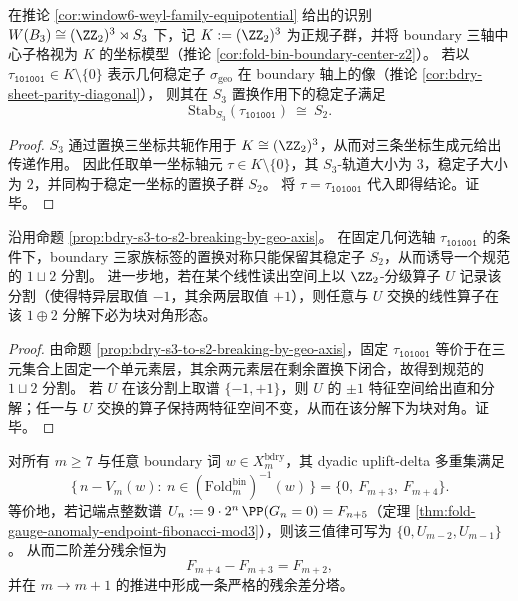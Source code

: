 \begin{proposition}\label{prop:bdry-s3-to-s2-breaking-by-geo-axis}
在推论 \ref{cor:window6-weyl-family-equipotential} 给出的识别
\(
W(B_3)\cong (\ZZ_2)^3\rtimes S_3
\)
下，记 \(K:=(\ZZ_2)^3\) 为正规子群，并将 boundary 三轴中心子格视为 \(K\) 的坐标模型（推论 \ref{cor:fold-bin-boundary-center-z2}）。
若以 \(\tau_{\texttt{101001}}\in K\setminus\{0\}\) 表示几何稳定子 \(\sigma_{\mathrm{geo}}\) 在 boundary 轴上的像（推论 \ref{cor:bdry-sheet-parity-diagonal}），
则其在 \(S_3\) 置换作用下的稳定子满足
\[
\mathrm{Stab}_{S_3}(\tau_{\texttt{101001}})\ \cong\ S_2.
\]
\end{proposition}
\begin{proof}
\(S_3\) 通过置换三坐标共轭作用于 \(K\cong(\ZZ_2)^3\)，从而对三条坐标生成元给出传递作用。
因此任取单一坐标轴元 \(\tau\in K\setminus\{0\}\)，其 \(S_3\)-轨道大小为 \(3\)，稳定子大小为 \(2\)，并同构于稳定一坐标的置换子群 \(S_2\)。
将 \(\tau=\tau_{\texttt{101001}}\) 代入即得结论。证毕。
\end{proof}

\begin{corollary}\label{cor:bdry-geo-axis-two-plus-one-family-splitting}
沿用命题 \ref{prop:bdry-s3-to-s2-breaking-by-geo-axis}。
在固定几何选轴 \(\tau_{\texttt{101001}}\) 的条件下，boundary 三家族标签的置换对称只能保留其稳定子 \(S_2\)，从而诱导一个规范的 \(1\sqcup 2\) 分割。
进一步地，若在某个线性读出空间上以 \(\ZZ_2\)-分级算子 \(U\) 记录该分割（使得特异层取值 \(-1\)，其余两层取值 \(+1\)），则任意与 \(U\) 交换的线性算子在该 \(1\oplus 2\) 分解下必为块对角形态。
\end{corollary}
\begin{proof}
由命题 \ref{prop:bdry-s3-to-s2-breaking-by-geo-axis}，固定 \(\tau_{\texttt{101001}}\) 等价于在三元集合上固定一个单元素层，其余两元素层在剩余置换下闭合，故得到规范的 \(1\sqcup 2\) 分割。
若 \(U\) 在该分割上取谱 \(\{-1,+1\}\)，则 \(U\) 的 \(\pm1\) 特征空间给出直和分解；任一与 \(U\) 交换的算子保持两特征空间不变，从而在该分解下为块对角。证毕。
\end{proof}

\begin{conjecture}\label{conj:bdry-uplift-fibonacci-three-value-law}
对所有 \(m\ge 7\) 与任意 boundary 词 \(w\in X_m^{\mathrm{bdry}}\)，其 dyadic uplift-delta 多重集满足
\[
\{\,n-V_m(w):\ n\in(\mathrm{Fold}^{\mathrm{bin}}_m)^{-1}(w)\,\}=\{0,\ F_{m+3},\ F_{m+4}\}.
\]
等价地，若记端点整数谱 \(U_n:=9\cdot 2^n\,\PP(G_n=0)=F_{n+5}\)（定理 \ref{thm:fold-gauge-anomaly-endpoint-fibonacci-mod3}），则该三值律可写为 \(\{0,U_{m-2},U_{m-1}\}\)。
从而二阶差分残余恒为
\[
F_{m+4}-F_{m+3}=F_{m+2},
\]
并在 \(m\to m+1\) 的推进中形成一条严格的残余差分塔。
\end{conjecture}

